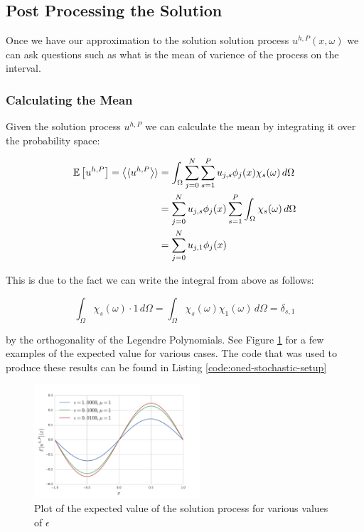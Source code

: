 \subsection{Post Processing the Solution}

Once we have our approximation to the solution solution process
$u^{h,P}(x,\omega)$ we can ask questions such as what is the mean of varience
of the process on the interval.

\subsubsection{Calculating the Mean}

Given the solution process $u^{h,P}$ we can calculate the mean by integrating it
over the probability space:

\begin{align}
  \begin{split}
    \mathbb{E}\left[u^{h,P}\right] = \left\langle\langle u^{h,P}\right\rangle\rangle &=
    \int_\Omega\sum_{j=0}^N\sum_{s=1}^Pu_{j,s}\phi_j(x)\chi_s(\omega)\, d\Omega \\
    &= \sum_{j=0}^Nu_{j,s}\phi_j(x)\sum_{s=1}^P\int_\Omega\chi_s(\omega)\, d\Omega \\
    &= \sum_{j=0}^Nu_{j,1}\phi_j(x)
  \end{split}
\end{align}

This is due to the fact we can write the integral from above as follows:

\begin{equation}
    \int_\Omega\chi_s(\omega)\cdot 1\, d\Omega =
    \int_\Omega\chi_s(\omega)\chi_1(\omega)\, d\Omega = \delta_{s,1}
\end{equation}

by the orthogonality of the Legendre Polynomials. See Figure
\ref{fig:oned-stochastic-expected-value-plots} for a few examples of the
expected value for various cases. The code that was used to produce these
results can be found in Listing \ref{code:oned-stochastic-setup}

\begin{figure}
    \centering
    \includegraphics[width=0.55\textwidth]{img/oned-stochastic-mean-soln-process.pdf}
    \caption{Plot of the expected value of the solution process for various
    values of $\epsilon$}
    \label{fig:oned-stochastic-expected-value-plots}
\end{figure}

